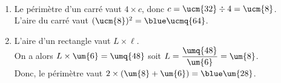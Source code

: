    \ \\ [-5mm]
   \begin{enumerate}
      \item Le périmètre d'un carré vaut $4\times c$, donc $c =\ucm{32}\div4 =\ucm{8}$. \\
         L'aire du carré vaut $(\ucm{8})^2 =\blue\ucmq{64}$.
      \item L'aire d'un rectangle vaut $L\times\ell$. \\
         On a alors $L\times\um{6} =\umq{48}$ soit $L =\dfrac{\umq{48}}{\um{6}} =\um{8}$. \\ [1mm]
         Donc, le périmètre vaut $2\times(\um{8}+\um{6}) =\blue\um{28}$.
   \end{enumerate}

